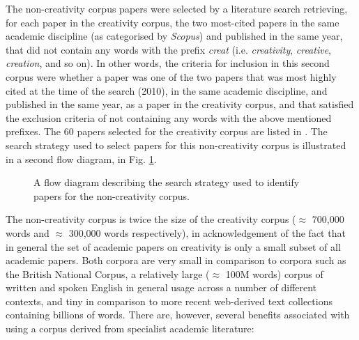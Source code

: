\documentclass[10pt,letterpaper]{article}
\begin{document}
The non-creativity corpus papers were selected by a literature search retrieving, for each paper in the creativity corpus, the two most-cited papers in the same academic discipline (as categorised by  {\em Scopus}) and published in the same year, that did not contain any words with the prefix {\em creat\/} (i.e. {\em creativity\/}, {\em creative\/}, {\em creation\/}, and so on). In other words, the criteria for inclusion in this second corpus were whether a paper was one of the two papers that was most highly cited at the time of the search (2010), in the same academic discipline, and published in the same year, as a paper in the creativity corpus, and that satisfied the exclusion criteria of not containing any words with the above mentioned prefixes. The 60 papers selected for the creativity corpus are listed in . The search strategy used to select papers for this non-creativity corpus is illustrated in a second flow diagram, in Fig. \ref{searchNonCC}. 

\begin{figure}
\caption{ A flow diagram describing the search strategy used to identify papers for the non-creativity corpus.}
\label{searchNonCC}
\end{figure} 


The non-creativity corpus is twice the size of the creativity corpus ($\approx$ 700,000 words and $\approx$ 300,000 words respectively), in acknowledgement of the fact that in general the set of academic papers on creativity is only a small subset of all academic papers. Both corpora are very small in comparison to corpora such as the British National Corpus, a relatively large  ($\approx$ 100M words) corpus of written and spoken English in general usage across a number of different contexts, and tiny in comparison to more recent web-derived text collections containing billions of words. There are, however, several benefits associated with using a corpus derived from specialist academic literature:
\end{document}
